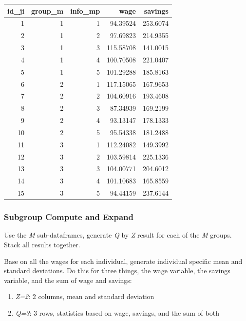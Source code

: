 \documentclass[
]{book}
\providecommand{\tightlist}{%
  \setlength{\itemsep}{0pt}\setlength{\parskip}{0pt}}
\begin{document}
\begin{table}[!h]
\centering
\begin{tabular}{r|r|r|r|r}
\hline
id\_ji & group\_m & info\_mp & wage & savings\\
\hline
\rowcolor{gray!6}  1 & 1 & 1 & 94.39524 & 253.6074\\
\hline
2 & 1 & 2 & 97.69823 & 214.9355\\
\hline
\rowcolor{gray!6}  3 & 1 & 3 & 115.58708 & 141.0015\\
\hline
4 & 1 & 4 & 100.70508 & 221.0407\\
\hline
\rowcolor{gray!6}  5 & 1 & 5 & 101.29288 & 185.8163\\
\hline
6 & 2 & 1 & 117.15065 & 167.9653\\
\hline
\rowcolor{gray!6}  7 & 2 & 2 & 104.60916 & 193.4608\\
\hline
8 & 2 & 3 & 87.34939 & 169.2199\\
\hline
\rowcolor{gray!6}  9 & 2 & 4 & 93.13147 & 178.1333\\
\hline
10 & 2 & 5 & 95.54338 & 181.2488\\
\hline
\rowcolor{gray!6}  11 & 3 & 1 & 112.24082 & 149.3992\\
\hline
12 & 3 & 2 & 103.59814 & 225.1336\\
\hline
\rowcolor{gray!6}  13 & 3 & 3 & 104.00771 & 204.6012\\
\hline
14 & 3 & 4 & 101.10683 & 165.8559\\
\hline
\rowcolor{gray!6}  15 & 3 & 5 & 94.44159 & 237.6144\\
\hline
\end{tabular}
\end{table}

\hypertarget{subgroup-compute-and-expand}{%
\subsubsection{Subgroup Compute and Expand}\label{subgroup-compute-and-expand}}

Use the \emph{M} sub-dataframes, generate \emph{Q} by \emph{Z} result for each of the \emph{M} groups. Stack all results together.

Base on all the wages for each individual, generate individual specific mean and standard deviations. Do this for three things, the wage variable, the savings variable, and the sum of wage and savings:

\begin{enumerate}
\def\labelenumi{\arabic{enumi}.}
\tightlist
\item
  \emph{Z=2}: 2 columns, mean and standard deviation
\item
  \emph{Q=3}: 3 rows, statistics based on wage, savings, and the sum of both
\end{enumerate}
\end{document}
